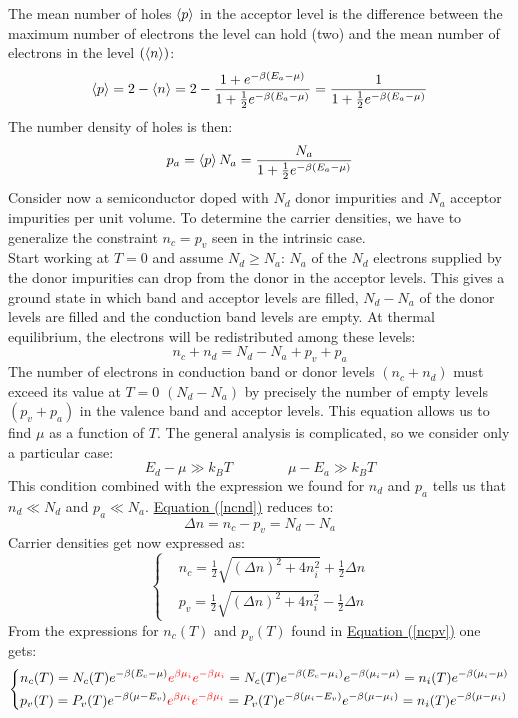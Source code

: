 \documentclass[10.75pt,a4paper,openright,bottom=2cm]{article}
\renewcommand{\refeq}[1]{\hyperref[#1]{Equation (\ref{#1})}}
\begin{document}
The mean number of holes $\Braket{p}$ in the acceptor level is the difference between the maximum number of electrons the level can hold (two) and the mean number of electrons in the level $(\Braket{n})$:
\[
\Braket{p}=2-\Braket{n}=2-\frac{1+e^{-\beta(E_a-\mu)}}{1+\frac{1}{2}e^{-\beta(E_a-\mu)}}=\frac{1}{1+\frac{1}{2}e^{-\beta(E_a-\mu)}}
\]
The number density of holes is then:
\[
p_a=\Braket{p}N_a=\frac{N_a}{1+\frac{1}{2}e^{-\beta(E_a-\mu)}}
\]
Consider now a semiconductor doped with $N_d$ donor impurities and $N_a$ acceptor impurities per unit volume. To determine the carrier densities, we have to generalize the constraint $n_c=p_v$ seen in the intrinsic case.\\
Start working at $T=0$ and assume $N_d\ge N_a$: $N_a$ of the $N_d$ electrons supplied by the donor impurities can drop from the donor in the acceptor levels. This gives a ground state in which band and acceptor levels are filled, $N_d-N_a$ of the donor levels are filled and the conduction band levels are empty. At thermal equilibrium, the electrons will be redistributed among these levels:
\begin{equation}
\label{ncnd}
n_c+n_d=N_d-N_a+p_v+p_a
\end{equation}
The number of electrons in conduction band or donor levels $(n_c+n_d)$ must exceed its value at $T=0$ $(N_d-N_a)$ by precisely the number of empty levels $(p_v+p_a)$ in the valence band and acceptor levels. This equation allows us to find $\mu$ as a function of $T$. The general analysis is complicated, so we consider only a particular case:
\[
E_d-\mu\gg k_BT \qquad \qquad \mu-E_a\gg k_BT
\]
This condition combined with the expression we found for $n_d$ and $p_a$ tells us that $n_d\ll N_d$ and $p_a\ll N_a$. \refeq{ncnd} reduces to:
\[
\Delta n=n_c-p_v=N_d-N_a
\]
Carrier densities get now expressed as:
\[
\left\{
\begin{aligned}
&n_c=\frac{1}{2}\sqrt{(\Delta n)^2+4n_i^2}+\frac{1}{2}\Delta n\\
&p_v=\frac{1}{2}\sqrt{(\Delta n)^2+4n_i^2}-\frac{1}{2}\Delta n
\end{aligned}
\right.
\]
From the expressions for $n_c(T)$ and $p_v(T)$ found in \refeq{ncpv} one gets:
\[
\left\{
\begin{aligned}
&n_c(T)=N_c(T)e^{-\beta(E_c-\mu)}{\color{red}{e^{\beta\mu_i}e^{-\beta\mu_i}}}=N_c(T)e^{-\beta(E_c-\mu_i)}e^{-\beta(\mu_i-\mu)}=n_i(T)e^{-\beta(\mu_i-\mu)}\\
&p_v(T)=P_v(T)e^{-\beta(\mu-E_v)}{\color{red}{e^{\beta\mu_i}e^{-\beta\mu_i}}}=P_v(T)e^{-\beta(\mu_i-E_v)}e^{-\beta(\mu-\mu_i)}=n_i(T)e^{-\beta(\mu-\mu_i)}
\end{aligned}
\right.
\]
\end{document}
